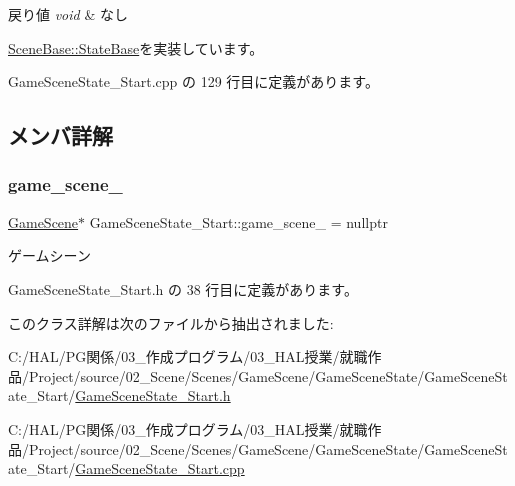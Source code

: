 \begin{DoxyRetVals}{戻り値}
{\em void} & なし \\
\hline
\end{DoxyRetVals}


\mbox{\hyperlink{class_scene_base_1_1_state_base_ad2c6c8fd9f020eb02f64f394edee129c}{Scene\+Base\+::\+State\+Base}}を実装しています。



 Game\+Scene\+State\+\_\+\+Start.\+cpp の 129 行目に定義があります。



\subsection{メンバ詳解}
\mbox{\label{class_game_scene_state___start_af9389c7c8496419a6a4a3d3339acd94f}} 
\subsubsection{\texorpdfstring{game\+\_\+scene\+\_\+}{game\_scene\_}}
{\footnotesize\ttfamily \mbox{\hyperlink{class_game_scene}{Game\+Scene}}$\ast$ Game\+Scene\+State\+\_\+\+Start\+::game\+\_\+scene\+\_\+ = nullptr\hspace{0.3cm}{\ttfamily [private]}}



ゲームシーン 



 Game\+Scene\+State\+\_\+\+Start.\+h の 38 行目に定義があります。



このクラス詳解は次のファイルから抽出されました\+:\begin{DoxyCompactItemize}
\item 
C\+:/\+H\+A\+L/\+P\+G関係/03\+\_\+作成プログラム/03\+\_\+\+H\+A\+L授業/就職作品/\+Project/source/02\+\_\+\+Scene/\+Scenes/\+Game\+Scene/\+Game\+Scene\+State/\+Game\+Scene\+State\+\_\+\+Start/\mbox{\hyperlink{_game_scene_state___start_8h}{Game\+Scene\+State\+\_\+\+Start.\+h}}\item 
C\+:/\+H\+A\+L/\+P\+G関係/03\+\_\+作成プログラム/03\+\_\+\+H\+A\+L授業/就職作品/\+Project/source/02\+\_\+\+Scene/\+Scenes/\+Game\+Scene/\+Game\+Scene\+State/\+Game\+Scene\+State\+\_\+\+Start/\mbox{\hyperlink{_game_scene_state___start_8cpp}{Game\+Scene\+State\+\_\+\+Start.\+cpp}}\end{DoxyCompactItemize}
